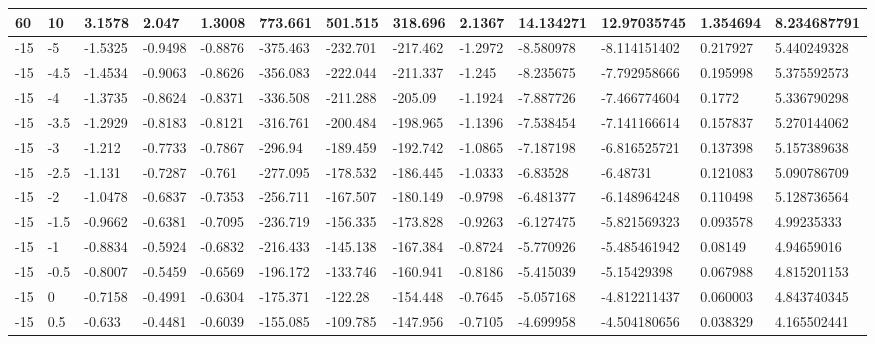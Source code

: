 \begin{longtable}{|l|l|l|l|l|l|l|l|l|l|l|l|l|}
60    & 10    & 3.1578  & 2.047   & 1.3008  & 773.661  & 501.515  & 318.696  & 2.1367   & 14.134271   & 12.97035745    & 1.354694                 & 8.234687791 \\ \hline
-15   & -5    & -1.5325 & -0.9498 & -0.8876 & -375.463 & -232.701 & -217.462 & -1.2972  & -8.580978   & -8.114151402   & 0.217927                 & 5.440249328 \\ \hline
-15   & -4.5  & -1.4534 & -0.9063 & -0.8626 & -356.083 & -222.044 & -211.337 & -1.245   & -8.235675   & -7.792958666   & 0.195998                 & 5.375592573 \\ \hline
-15   & -4    & -1.3735 & -0.8624 & -0.8371 & -336.508 & -211.288 & -205.09  & -1.1924  & -7.887726   & -7.466774604   & 0.1772                   & 5.336790298 \\ \hline
-15   & -3.5  & -1.2929 & -0.8183 & -0.8121 & -316.761 & -200.484 & -198.965 & -1.1396  & -7.538454   & -7.141166614   & 0.157837                 & 5.270144062 \\ \hline
-15   & -3    & -1.212  & -0.7733 & -0.7867 & -296.94  & -189.459 & -192.742 & -1.0865  & -7.187198   & -6.816525721   & 0.137398                 & 5.157389638 \\ \hline
-15   & -2.5  & -1.131  & -0.7287 & -0.761  & -277.095 & -178.532 & -186.445 & -1.0333  & -6.83528    & -6.48731       & 0.121083                 & 5.090786709 \\ \hline
-15   & -2    & -1.0478 & -0.6837 & -0.7353 & -256.711 & -167.507 & -180.149 & -0.9798  & -6.481377   & -6.148964248   & 0.110498                 & 5.128736564 \\ \hline
-15   & -1.5  & -0.9662 & -0.6381 & -0.7095 & -236.719 & -156.335 & -173.828 & -0.9263  & -6.127475   & -5.821569323   & 0.093578                 & 4.99235333  \\ \hline
-15   & -1    & -0.8834 & -0.5924 & -0.6832 & -216.433 & -145.138 & -167.384 & -0.8724  & -5.770926   & -5.485461942   & 0.08149                  & 4.94659016  \\ \hline
-15   & -0.5  & -0.8007 & -0.5459 & -0.6569 & -196.172 & -133.746 & -160.941 & -0.8186  & -5.415039   & -5.15429398    & 0.067988                 & 4.815201153 \\ \hline
-15   & 0     & -0.7158 & -0.4991 & -0.6304 & -175.371 & -122.28  & -154.448 & -0.7645  & -5.057168   & -4.812211437   & 0.060003                 & 4.843740345 \\ \hline
-15   & 0.5   & -0.633  & -0.4481 & -0.6039 & -155.085 & -109.785 & -147.956 & -0.7105  & -4.699958   & -4.504180656   & 0.038329                 & 4.165502441 \\ \hline

\end{longtable}
